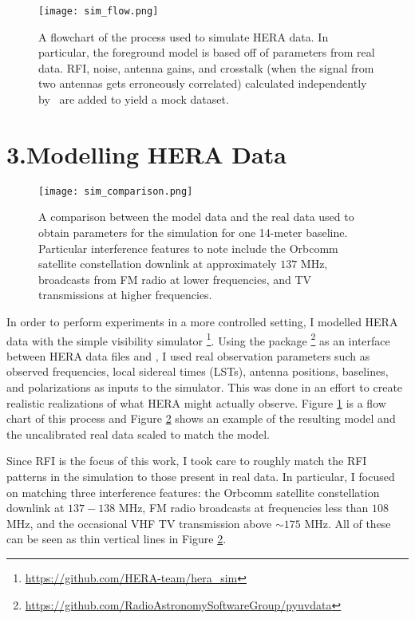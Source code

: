 \documentclass[12pt]{article}
\begin{document}
\begin{figure}[t]
	\centering
	\texttt{[image: sim\_flow.png]}
	\caption[Flowchart of the process of modelling HERA data]{A flowchart of the process used to simulate HERA data. In particular, the foreground model is based off of parameters from real data. RFI, noise, antenna gains, and crosstalk (when the signal from two antennas gets erroneously correlated) calculated independently by \herasim~are added to yield a mock dataset.}
	\label{fig:sim_flow}
\end{figure}

\tocless\section{\hypertarget{sec:modelling}{3.\hspace{0.75em}Modelling HERA Data}}

\begin{figure}[p]
	\centering
	\texttt{[image: sim\_comparison.png]}
	\caption[Comparison of simulated and real data]{A comparison between the model data and the real data used to obtain parameters for the simulation for one 14-meter baseline. Particular interference features to note include the Orbcomm satellite constellation downlink at approximately $137$ MHz, broadcasts from FM radio at lower frequencies, and TV transmissions at higher frequencies.}
	\label{fig:sim_comparison}
\end{figure}

In order to perform experiments in a more controlled setting, I modelled HERA data with the simple visibility simulator \herasim\footnote{\url{https://github.com/HERA-team/hera_sim}}. Using the package \pyuvdata\footnote{\url{https://github.com/RadioAstronomySoftwareGroup/pyuvdata}} as an interface between HERA data files and \herasim, I used real observation parameters such as observed frequencies, local sidereal times (LSTs), antenna positions, baselines, and polarizations as inputs to the simulator. This was done in an effort to create realistic realizations of what HERA might actually observe. Figure \ref{fig:sim_flow} is a flow chart of this process and Figure \ref{fig:sim_comparison} shows an example of the resulting model and the uncalibrated real data scaled to match the model.

Since RFI is the focus of this work, I took care to roughly match the RFI patterns in the simulation to those present in real data. In particular, I focused on matching three interference features: the Orbcomm satellite constellation downlink at $137 - 138$ MHz, FM radio broadcasts at frequencies less than $108$ MHz, and the occasional VHF TV transmission above $\sim 175$ MHz. All of these can be seen as thin vertical lines in Figure \ref{fig:sim_comparison}.
\end{document}
